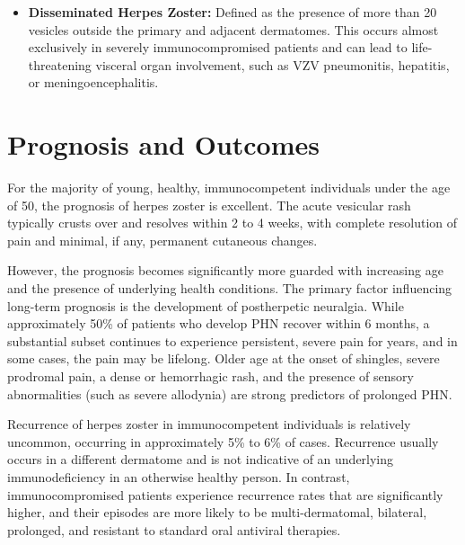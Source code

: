 \begin{itemize}
\begin{itemize}
        \item \textbf{Myelitis or Encephalitis:} Inflammation of the spinal cord or brain, causing weakness, sensory loss, confusion, seizures, or coma.
        \item \textbf{Post-Herpetic Stroke Syndrome:} A rare form of vasculitis caused by direct viral invasion of cerebral arteries, leading to an increased risk of stroke weeks or months after the shingles episode.
    \end{itemize}
    \item \textbf{Disseminated Herpes Zoster:} Defined as the presence of more than 20 vesicles outside the primary and adjacent dermatomes. This occurs almost exclusively in severely immunocompromised patients and can lead to life-threatening visceral organ involvement, such as VZV pneumonitis, hepatitis, or meningoencephalitis.
\end{itemize}

\section*{Prognosis and Outcomes}
For the majority of young, healthy, immunocompetent individuals under the age of 50, the prognosis of herpes zoster is excellent. The acute vesicular rash typically crusts over and resolves within 2 to 4 weeks, with complete resolution of pain and minimal, if any, permanent cutaneous changes.

However, the prognosis becomes significantly more guarded with increasing age and the presence of underlying health conditions. The primary factor influencing long-term prognosis is the development of postherpetic neuralgia. While approximately 50\% of patients who develop PHN recover within 6 months, a substantial subset continues to experience persistent, severe pain for years, and in some cases, the pain may be lifelong. Older age at the onset of shingles, severe prodromal pain, a dense or hemorrhagic rash, and the presence of sensory abnormalities (such as severe allodynia) are strong predictors of prolonged PHN.

Recurrence of herpes zoster in immunocompetent individuals is relatively uncommon, occurring in approximately 5\% to 6\% of cases. Recurrence usually occurs in a different dermatome and is not indicative of an underlying immunodeficiency in an otherwise healthy person. In contrast, immunocompromised patients experience recurrence rates that are significantly higher, and their episodes are more likely to be multi-dermatomal, bilateral, prolonged, and resistant to standard oral antiviral therapies.

